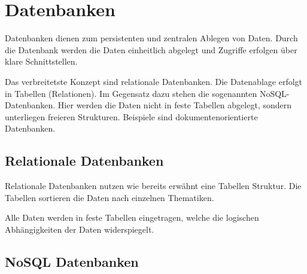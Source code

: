 \section{Datenbanken}
Datenbanken dienen zum persistenten und zentralen Ablegen von Daten. Durch die Datenbank werden die Daten einheitlich abgelegt und Zugriffe erfolgen über klare Schnittstellen. 

Das verbreitetste Konzept sind relationale Datenbanken. Die Datenablage erfolgt in Tabellen (Relationen). Im Gegensatz dazu stehen die sogenannten NoSQL-Datenbanken. Hier werden die Daten nicht in feste Tabellen abgelegt, sondern unterliegen freieren Strukturen. Beispiele sind dokumentenorientierte Datenbanken. 


\subsection{Relationale Datenbanken}
    Relationale Datenbanken nutzen wie bereits erwähnt eine Tabellen Struktur. Die Tabellen sortieren die Daten nach einzelnen Thematiken.
    
    
    Alle Daten werden in feste Tabellen eingetragen, welche die logischen Abhängigkeiten der Daten widerspiegelt. 

\subsection{NoSQL Datenbanken}
